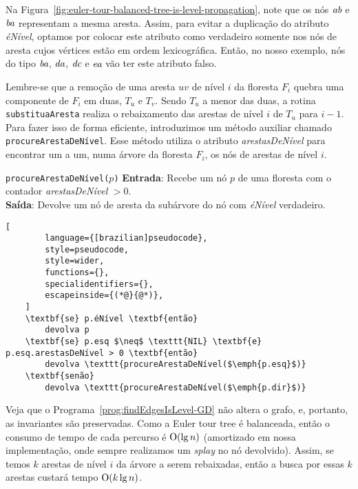 Na Figura~\ref{fig:euler-tour-balanced-tree-is-level-propagation}, note que os nós $\emph{ab}$ e $\emph{ba}$ representam a mesma aresta. Assim, para evitar a duplicação do atributo \textit{éNível}, optamos por colocar este atributo como verdadeiro somente nos nós de aresta cujos vértices estão em ordem lexicográfica. Então, no nosso exemplo, nós do tipo $\emph{ba}$, $\emph{da}$, $\emph{dc}$ e $\emph{ea}$ vão ter este atributo falso. 

Lembre-se que a remoção de uma aresta $uv$ de nível $i$ da floresta $F_i$ quebra uma componente de $F_i$ em duas, $T_u$ e $T_v$. Sendo $T_u$ a menor das duas, a rotina \texttt{substituaAresta} realiza o rebaixamento das arestas de nível $i$ de $T_u$ para $i-1$. Para fazer isso de forma eficiente, introduzimos um método auxiliar chamado \texttt{procureArestaDeNível}. Esse método utiliza o atributo \textit{arestasDeNível} para encontrar um a um, numa árvore da floresta $F_i$, os nós de arestas de nível $i$.

\begin{programruledcaption}{\texttt{procureArestaDeNível($p$)} \label{prog:findEdgesIsLevel-GD}}
    \noindent\textbf{Entrada}: Recebe um nó $p$ de uma floresta com o contador \textit{arestasDeNível} $> 0$.
    \\
    \noindent\textbf{Saída}: Devolve um nó de aresta da subárvore do nó com \textit{éNível} verdadeiro.
    \vspace{-0.5\baselineskip}
    \begin{lstlisting}[
        language={[brazilian]pseudocode},
        style=pseudocode,
        style=wider,
        functions={},
        specialidentifiers={},
        escapeinside={(*@}{@*)},
    ]
    \textbf{se} p.éNível \textbf{então}
        devolva p
    \textbf{se} p.esq $\neq$ \texttt{NIL} \textbf{e} p.esq.arestasDeNível > 0 \textbf{então}
        devolva \texttt{procureArestaDeNível($\emph{p.esq}$)}
    \textbf{senão}
        devolva \texttt{procureArestaDeNível($\emph{p.dir}$)}
\end{lstlisting}
\vspace{-0.5\baselineskip}
\end{programruledcaption}

Veja que o Programa~\ref{prog:findEdgesIsLevel-GD} não altera o grafo, e, portanto, as invariantes são preservadas. Como a Euler tour tree é balanceada, então o consumo de tempo de cada percurso é $\mathrm{O}(\lg n)$ (amortizado em nossa implementação, onde sempre realizamos um \textit{splay} no nó devolvido). Assim, se temos $k$ arestas de nível $i$ da árvore a serem rebaixadas, então a busca por essas $k$ arestas custará tempo $\mathrm{O}(k \lg n)$.

